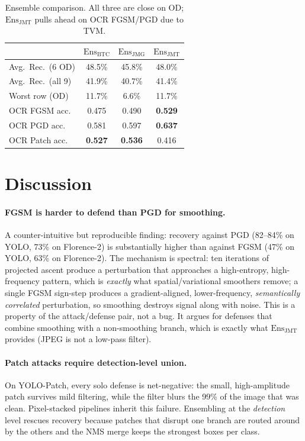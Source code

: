 \documentclass[10pt,twocolumn,letterpaper]{article}
\newcommand{\best}[1]{\textbf{#1}}
\begin{document}
\begin{table}[t]
\centering
\small
\setlength{\tabcolsep}{3pt}
\begin{tabular}{l|ccc}
\toprule
 & $\mathrm{Ens}_{\text{BTC}}$ & $\mathrm{Ens}_{\text{JMG}}$ & $\mathrm{Ens}_{\text{JMT}}$ \\
\midrule
Avg.\ Rec.\ (6 OD)   & 48.5\% & 45.8\% & 48.0\% \\
Avg.\ Rec.\ (all 9)   & 41.9\% & 40.7\% & 41.4\% \\
Worst row (OD)        & 11.7\% & 6.6\%  & 11.7\% \\
OCR FGSM acc.         & 0.475  & 0.490  & \best{0.529} \\
OCR PGD acc.          & 0.581  & 0.597  & \best{0.637} \\
OCR Patch acc.        & \best{0.527}  & \best{0.536}  & 0.416 \\
\bottomrule
\end{tabular}
\caption{Ensemble comparison. All three are close on OD; $\mathrm{Ens}_{\text{JMT}}$ pulls ahead on OCR FGSM/PGD due to TVM.}
\label{tab:ens_comparison}
\end{table}

\section{Discussion}
\label{sec:discussion}

\paragraph{FGSM is harder to defend than PGD for smoothing.}
A counter-intuitive but reproducible finding: recovery against PGD (82--84\% on YOLO, 73\% on Florence-2) is substantially higher than against FGSM (47\% on YOLO, 63\% on Florence-2). The mechanism is spectral: ten iterations of projected ascent produce a perturbation that approaches a high-entropy, high-frequency pattern, which is \emph{exactly} what spatial/variational smoothers remove; a single FGSM sign-step produces a gradient-aligned, lower-frequency, \emph{semantically correlated} perturbation, so smoothing destroys signal along with noise. This is a property of the attack/defense pair, not a bug. It argues for defenses that combine smoothing with a non-smoothing branch, which is exactly what $\mathrm{Ens}_{\text{JMT}}$ provides (JPEG is not a low-pass filter).

\paragraph{Patch attacks require detection-level union.}
On YOLO-Patch, every solo defense is net-negative: the small, high-amplitude patch survives mild filtering, while the filter blurs the 99\% of the image that was clean. Pixel-stacked pipelines inherit this failure. Ensembling at the \emph{detection} level rescues recovery because patches that disrupt one branch are routed around by the others and the NMS merge keeps the strongest boxes per class.
\end{document}
